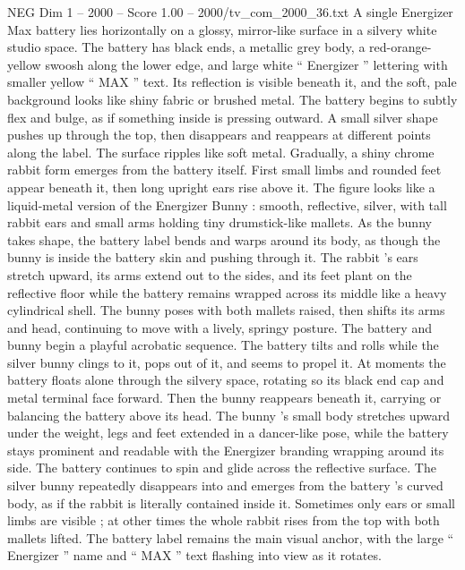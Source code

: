 \begin{textsample}{NEG Dim 1 – 2000 – Score 1.00 – 2000/tv\_com\_2000\_36.txt}  \label{ex:f1_neg_069}
A single Energizer Max battery lies horizontally on a glossy, mirror-like surface in a silvery white studio space.
The battery has black ends, a metallic grey body, a red-orange-yellow swoosh along the lower edge, and large white “ Energizer ” lettering with smaller yellow “ MAX ” text.
Its reflection is visible beneath it, and the soft, pale background looks like shiny fabric or brushed metal.
The battery begins to subtly flex and bulge, as if something inside is pressing outward.
A small silver shape pushes up through the top, then disappears and reappears at different points along the label.
The surface ripples like soft metal.
Gradually, a shiny chrome rabbit form emerges from the battery itself.
First small limbs and rounded feet appear beneath it, then long upright ears rise above it.
The figure looks like a liquid-metal version of the Energizer Bunny : smooth, reflective, silver, with tall rabbit ears and small arms holding tiny drumstick-like mallets.
As the bunny takes shape, the battery label bends and warps around its body, as though the bunny is inside the battery skin and pushing through it.
The rabbit ’s ears stretch upward, its arms extend out to the sides, and its feet plant on the reflective floor while the battery remains wrapped across its middle like a heavy cylindrical shell.
The bunny poses with both mallets raised, then shifts its arms and head, continuing to move with a lively, springy posture.
The battery and bunny begin a playful acrobatic sequence.
The battery tilts and rolls while the silver bunny clings to it, pops out of it, and seems to propel it.
At moments the battery floats alone through the silvery space, rotating so its black end cap and metal terminal face forward.
Then the bunny reappears beneath it, carrying or balancing the battery above its head.
The bunny ’s small body stretches upward under the weight, legs and feet extended in a dancer-like pose, while the battery stays prominent and readable with the Energizer branding wrapping around its side.
The battery continues to spin and glide across the reflective surface.
The silver bunny repeatedly disappears into and emerges from the battery ’s curved body, as if the rabbit is literally contained inside it.
Sometimes only ears or small limbs are visible ; at other times the whole rabbit rises from the top with both mallets lifted.
The battery label remains the main visual anchor, with the large “ Energizer ” name and “ MAX ” text flashing into view as it rotates.

\end{textsample}
